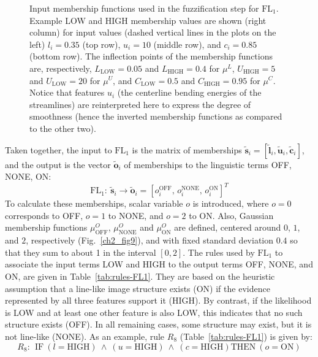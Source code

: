 \begin{figure}
	\caption{Input membership functions used in the fuzzification step for $\textrm{FL}_{1}$. Example LOW and HIGH membership values are shown (right column) for input values (dashed vertical lines in the plots on the left) $l_{i}=0.35$ (top row), $u_{i}=10$ (middle row), and $c_{i}=0.85$ (bottom row). The inflection points of the membership functions are, respectively, $L_{\textrm{LOW}}=0.05$ and $L_{\textrm{HIGH}}=0.4$ for $\mu^{L}$, $U_{\textrm{HIGH}}=5$ and $U_{\textrm{LOW}}=20$ for $\mu^{U}$, and $C_{\textrm{LOW}}=0.5$ and $C_{\textrm{HIGH}}=0.95$ for $\mu^{C}$. Notice that features $u_{i}$ (the centerline bending energies of the streamlines) are reinterpreted here to express the degree of smoothness (hence the inverted membership functions as compared to the other two).}
	\label{ch2_fig7}
\end{figure}
Taken together, the input to $\textrm{FL}_{1}$ is the matrix of memberships $\tilde{\mathbf{s}}_{i}=[\tilde{\mathbf{l}}_{i},\tilde{\mathbf{u}}_{i},\tilde{\mathbf{c}}_{i}]$, and the output is the vector $\tilde{\mathbf{o}}_{i}$ of memberships to the linguistic terms OFF, NONE, ON:
\begin{equation}
\mathrm{FL}_{1}\!:\ \tilde{\mathbf{s}}_{i} \rightarrow \tilde{\mathbf{o}}_{i} = \left[o_{i}^{\textrm{OFF}}\!,\, o_{i}^{\textrm{NONE}}\!,\, o_{i}^{\textrm{ON}}\right]^T
\label{eq:FL1}
\end{equation}
To calculate these memberships, scalar variable $o$ is introduced, where $o=0$ corresponds to OFF, $o=1$ to NONE, and $o=2$ to ON. Also, Gaussian membership functions $\mu_{\textrm{OFF}}^{O}$, $\mu_{\textrm{NONE}}^{O}$ and $\mu_{\textrm{ON}}^{O}$  are defined, centered around $0$, $1$, and $2$, respectively (Fig.~\ref{ch2_fig9}), and with fixed standard deviation $0.4$ so that they sum to about 1 in the interval $[0,2]$. The rules used by $\textrm{FL}_{1}$ to associate the input terms LOW and HIGH to the output terms OFF, NONE, and ON, are given in Table~\ref{tab:rules-FL1}. They are based on the heuristic assumption that a line-like image structure exists (ON) if the evidence represented by all three features support it (HIGH). By contrast, if the likelihood is LOW and at least one other feature is also LOW, this indicates that no such structure exists (OFF). In all remaining cases, some structure may exist, but it is not line-like (NONE). As an example, rule $R_8$ (Table~\ref{tab:rules-FL1}) is given by:
\begin{equation}
R_8\!:\ \ \textrm{IF}\ (l=\textrm{HIGH})\ \wedge\ (u=\textrm{HIGH})\ \wedge\ (c=\textrm{HIGH}) \textrm{THEN}\ (o = \textrm{ON})
\end{equation}
